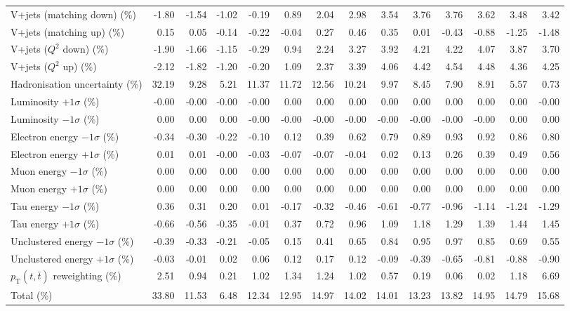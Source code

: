 \begin{table}[htbp]
{\begin{tabular}{lrrrrrrrrrrrrr}
V+jets (matching down) (\%) & -1.80 & -1.54 & -1.02 & -0.19 & 0.89 & 2.04 & 2.98 & 3.54 & 3.76 & 3.76 & 3.62 & 3.48 & 3.42 \\ 
V+jets (matching up) (\%) & 0.15 & 0.05 & -0.14 & -0.22 & -0.04 & 0.27 & 0.46 & 0.35 & 0.01 & -0.43 & -0.88 & -1.25 & -1.48 \\ 
V+jets ($Q^{2}$ down) (\%) & -1.90 & -1.66 & -1.15 & -0.29 & 0.94 & 2.24 & 3.27 & 3.92 & 4.21 & 4.22 & 4.07 & 3.87 & 3.70 \\ 
V+jets ($Q^{2}$ up) (\%) & -2.12 & -1.82 & -1.20 & -0.20 & 1.09 & 2.37 & 3.39 & 4.06 & 4.42 & 4.54 & 4.48 & 4.36 & 4.25 \\ 
Hadronisation uncertainty (\%) & 32.19 & 9.28 & 5.21 & 11.37 & 11.72 & 12.56 & 10.24 & 9.97 & 8.45 & 7.90 & 8.91 & 5.57 & 0.73 \\ 
Luminosity $+1\sigma$ (\%) & -0.00 & -0.00 & -0.00 & -0.00 & 0.00 & 0.00 & 0.00 & 0.00 & 0.00 & 0.00 & 0.00 & 0.00 & -0.00 \\ 
Luminosity $-1\sigma$ (\%) & 0.00 & 0.00 & 0.00 & -0.00 & -0.00 & -0.00 & -0.00 & -0.00 & -0.00 & -0.00 & -0.00 & 0.00 & 0.00 \\ 
Electron energy $-1\sigma$ (\%) & -0.34 & -0.30 & -0.22 & -0.10 & 0.12 & 0.39 & 0.62 & 0.79 & 0.89 & 0.93 & 0.92 & 0.86 & 0.80 \\ 
Electron energy $+1\sigma$ (\%) & 0.01 & 0.01 & -0.00 & -0.03 & -0.07 & -0.07 & -0.04 & 0.02 & 0.13 & 0.26 & 0.39 & 0.49 & 0.56 \\ 
Muon energy $-1\sigma$ (\%) & 0.00 & 0.00 & 0.00 & 0.00 & 0.00 & 0.00 & 0.00 & 0.00 & 0.00 & 0.00 & 0.00 & 0.00 & 0.00 \\ 
Muon energy $+1\sigma$ (\%) & 0.00 & 0.00 & 0.00 & 0.00 & 0.00 & 0.00 & 0.00 & 0.00 & 0.00 & 0.00 & 0.00 & 0.00 & 0.00 \\ 
Tau energy $-1\sigma$ (\%) & 0.36 & 0.31 & 0.20 & 0.01 & -0.17 & -0.32 & -0.46 & -0.61 & -0.77 & -0.96 & -1.14 & -1.24 & -1.29 \\ 
Tau energy $+1\sigma$ (\%) & -0.66 & -0.56 & -0.35 & -0.01 & 0.37 & 0.72 & 0.96 & 1.09 & 1.18 & 1.29 & 1.39 & 1.44 & 1.45 \\ 
Unclustered energy $-1\sigma$ (\%) & -0.39 & -0.33 & -0.21 & -0.05 & 0.15 & 0.41 & 0.65 & 0.84 & 0.95 & 0.97 & 0.85 & 0.69 & 0.55 \\ 
Unclustered energy $+1\sigma$ (\%) & -0.03 & -0.01 & 0.02 & 0.06 & 0.12 & 0.17 & 0.12 & -0.09 & -0.39 & -0.65 & -0.81 & -0.88 & -0.90 \\ 
$p_\mathrm{T}(t,\bar{t})$ reweighting (\%) & 2.51 & 0.94 & 0.21 & 1.02 & 1.34 & 1.24 & 1.02 & 0.57 & 0.19 & 0.06 & 0.02 & 1.18 & 6.69 \\ 
\hline 
Total (\%) & 33.80  & 11.53  & 6.48  & 12.34  & 12.95  & 14.97  & 14.02  & 14.01  & 13.23  & 13.82  & 14.95  & 14.79  & 15.68 \\ 
\hline 
\end{tabular}
}
\end{table}
